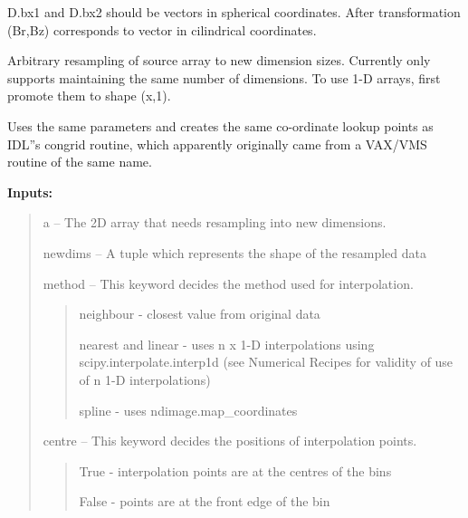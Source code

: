 \documentclass[letterpaper,10pt,english]{sphinxmanual}
\begin{document}
\begin{fulllineitems}
\begin{fulllineitems}
\begin{quote}


\end{quote}

D.bx1 and D.bx2 should be vectors in spherical coordinates. After transformation (Br,Bz) corresponds to vector in cilindrical coordinates.

\end{fulllineitems}


\begin{fulllineitems}
\label{tools:pyPLUTO.Tools.congrid}
Arbitrary resampling of source array to new dimension sizes.
Currently only supports maintaining the same number of dimensions.
To use 1-D arrays, first promote them to shape (x,1).

Uses the same parameters and creates the same co-ordinate lookup points
as IDL''s congrid routine, which apparently originally came from a VAX/VMS
routine of the same name.

\textbf{Inputs:}
\begin{quote}

a -- The 2D array that needs resampling into new dimensions.

newdims -- A tuple which represents the shape of the resampled data

method -- This keyword decides the method used for interpolation.
\begin{quote}

neighbour - closest value from original data

nearest and linear - uses n x 1-D interpolations using scipy.interpolate.interp1d
(see Numerical Recipes for validity of use of n 1-D interpolations)

spline - uses ndimage.map\_coordinates
\end{quote}

centre -- This keyword decides the positions of interpolation points.
\begin{quote}

True - interpolation points are at the centres of the bins

False - points are at the front edge of the bin
\end{quote}


\end{quote}
\end{fulllineitems}
\end{fulllineitems}
\end{document}
